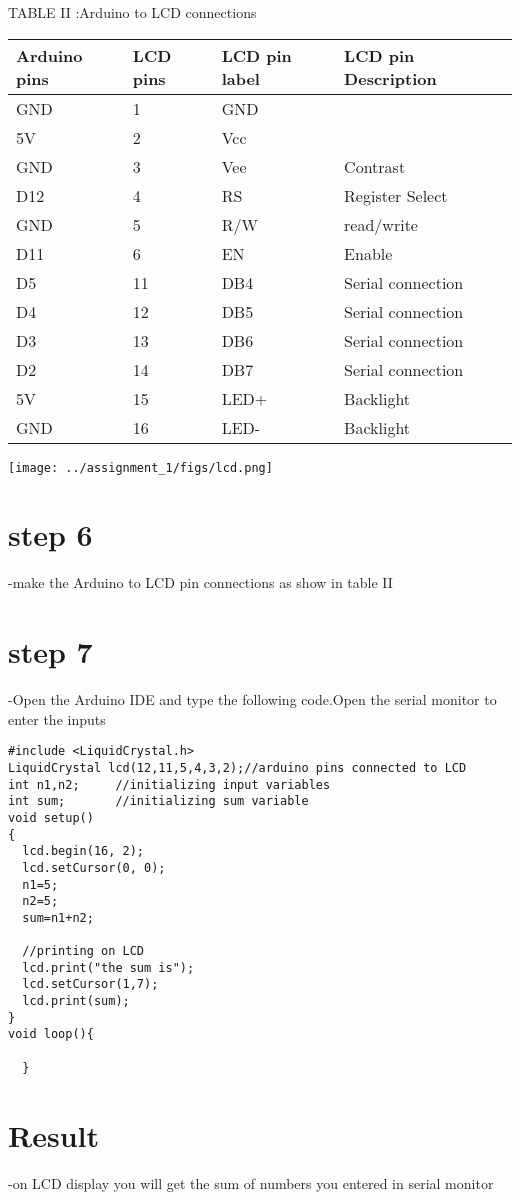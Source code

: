 \documentclass[twocolumn,13pt]{article}
\begin{document}
\begin{center}
    TABLE II :Arduino to LCD connections
\end{center}
 \begin{tabular}{ |p{1.5cm}|p{1.5cm}|p{1.5cm}|p{1.5cm}| }
 \hline
 \setlength{\tabcolsep}{3pt}
Arduino pins & LCD pins & LCD pin label & LCD pin Description\\
\hline
 GND & 1& GND & \\
 \hline
 5V & 2 & Vcc &\\
 \hline
 GND & 3 & Vee & Contrast\\
 \hline
 D12 & 4 & RS & Register Select\\
 \hline
 GND & 5 & R/W & read/write\\
 \hline
 D11 & 6 & EN &Enable\\
 \hline
 D5 & 11 & DB4 & Serial connection\\
 \hline
 D4 & 12 & DB5 & Serial connection\\
 \hline
 D3 & 13 & DB6 & Serial connection\\
 \hline
 D2 & 14 & DB7 & Serial connection\\
 \hline
 5V & 15 & LED+ & Backlight\\
 \hline
 GND & 16 & LED- & Backlight\\
 \hline
\end{tabular}



\texttt{[image: ../assignment\_1/figs/lcd.png]} 




\section*{step 6}
-make the Arduino to LCD pin connections as show in  table II
\section*{step 7}
-Open the Arduino IDE and type the following code.Open the serial monitor to enter the inputs

\begin{verbatim}
#include <LiquidCrystal.h>
LiquidCrystal lcd(12,11,5,4,3,2);//arduino pins connected to LCD
int n1,n2;     //initializing input variables
int sum;       //initializing sum variable
void setup()
{
  lcd.begin(16, 2);
  lcd.setCursor(0, 0);
  n1=5;
  n2=5;
  sum=n1+n2;

  //printing on LCD
  lcd.print("the sum is");
  lcd.setCursor(1,7);
  lcd.print(sum);                     
}
void loop(){
    
  }
 \end{verbatim}


\section*{Result}
-on LCD display you will get the sum of numbers you entered in serial monitor
\end{document}
